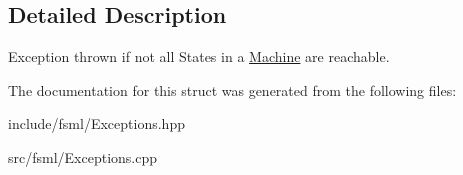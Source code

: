 \subsection{Detailed Description}
Exception thrown if not all States in a \hyperlink{classfsml_1_1Machine}{Machine} are reachable. 



The documentation for this struct was generated from the following files\-:\begin{DoxyCompactItemize}
\item 
include/fsml/Exceptions.\-hpp\item 
src/fsml/Exceptions.\-cpp\end{DoxyCompactItemize}
